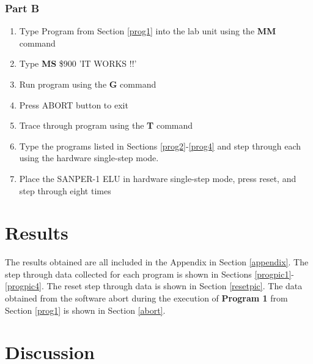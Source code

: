 \documentclass[12pt, twocolumn]{article}
\begin{document}
\subsubsection{Part B}
\begin{enumerate}
	\item Type Program from Section \ref{prog1} into the lab unit using the \textbf{MM} command
	\item Type \textbf{MS} \$900 'IT WORKS !!'
	\item Run program using the \textbf{G} command
	\item Press \textsc{ABORT} button to exit
	\item Trace through program using the \textbf{T} command
	\item Type the programs listed in Sections \ref{prog2}-\ref{prog4} and step through each using the hardware single-step mode.
	\item Place the \textsc{SANPER-1 ELU} in hardware single-step mode, press reset, and step through eight times
\end{enumerate}
\section{Results}
The results obtained are all included in the Appendix in Section \ref{appendix}. The step through data collected for each program is shown in Sections \ref{progpic1}-\ref{progpic4}. The reset step through data is shown in Section \ref{resetpic}. The data obtained from the software abort during the execution of \textbf{Program 1} from Section \ref{prog1} is shown in Section \ref{abort}.
\section{Discussion}
\end{document}
